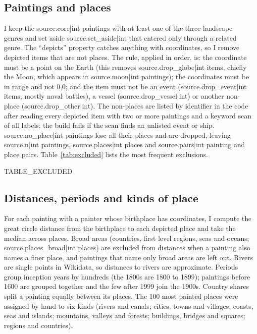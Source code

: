 \documentclass[11pt,a4paper]{article}
\begin{document}
\subsection{Paintings and places}
I keep the {{source.core|int}} paintings with at least one of the three landscape genres and set aside {{source.set_aside|int}} that entered only through a related genre. The ``depicts'' property catches anything with coordinates, so I remove depicted items that are not places. The rule, applied in order, is: the coordinate must be a point on the Earth (this removes {{source.drop_globe|int}} items, chiefly the Moon, which appears in {{source.moon|int}} paintings); the coordinates must be in range and not 0,0; and the item must not be an event ({{source.drop_event|int}} items, mostly naval battles), a vessel ({{source.drop_vessel|int}}) or another non-place ({{source.drop_other|int}}). The non-places are listed by identifier in the code after reading every depicted item with two or more paintings and a keyword scan of all labels; the build fails if the scan finds an unlisted event or ship. {{source.no_place|int}} paintings lose all their places and are dropped, leaving {{source.n|int}} paintings, {{source.places|int}} places and {{source.pairs|int}} painting and place pairs. Table~\ref{tab:excluded} lists the most frequent exclusions.

{{TABLE_EXCLUDED}}

\subsection{Distances, periods and kinds of place}
For each painting with a painter whose birthplace has coordinates, I compute the great circle distance from the birthplace to each depicted place and take the median across places. Broad areas (countries, first level regions, seas and oceans; {{source.places_broad|int}} places) are excluded from distances when a painting also names a finer place, and paintings that name only broad areas are left out. Rivers are single points in Wikidata, so distances to rivers are approximate. Periods group inception years by hundreds (the 1800s are 1800 to 1899); paintings before 1600 are grouped together and the few after 1999 join the 1900s. Country shares split a painting equally between its places. The 100 most painted places were assigned by hand to six kinds (rivers and canals; cities, towns and villages; coasts, seas and islands; mountains, valleys and forests; buildings, bridges and squares; regions and countries).
\end{document}
